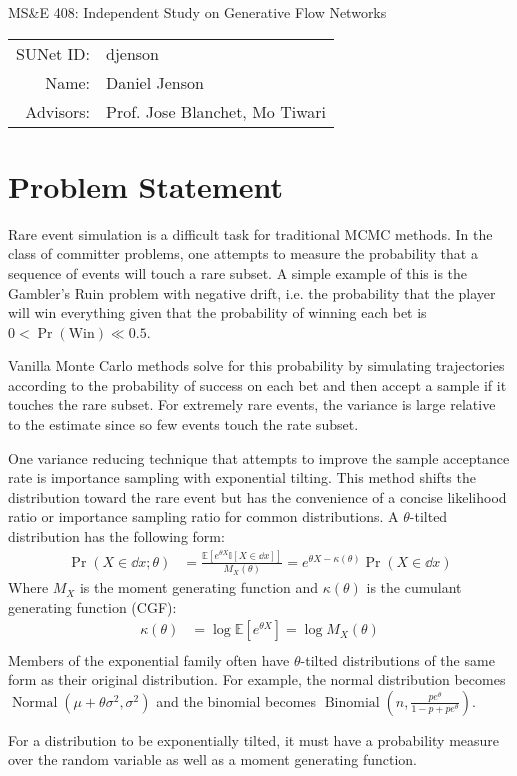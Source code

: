 \documentclass[12pt]{article}
\begin{document}
\begin{center}
  {\Large MS\&E 408: Independent Study on Generative Flow Networks}

	\begin{tabular}{rl}
		SUNet ID:      & djenson                            \\
		Name:          & Daniel Jenson                      \\
		Advisors: & Prof. Jose Blanchet, Mo Tiwari
	\end{tabular}
\end{center}

\section*{Problem Statement}
Rare event simulation is a difficult task for traditional MCMC methods. In the
class of committer problems, one attempts to measure the probability that a
sequence of events will touch a rare subset. A simple example of this is the
Gambler's Ruin problem with negative drift, i.e. the probability that the
player will win everything given that the probability of winning each bet is $0
< \Pr(\text{Win}) \ll 0.5$.
\par
Vanilla Monte Carlo methods solve for this probability by simulating
trajectories according to the probability of success on each bet and then
accept a sample if it touches the rare subset. For extremely rare events, the
variance is large relative to the estimate since so few events touch the rate
subset.
\par
One variance reducing technique that attempts to improve the sample acceptance
rate is importance sampling with exponential tilting. This method shifts the
distribution toward the rare event but has the convenience of a concise
likelihood ratio or importance sampling ratio for common distributions. A
$\theta$-tilted distribution has the following form:
\[
  \begin{aligned}
      \Pr(X\in\dd x;\theta) &= \frac{\mathbb{E}\left[e^{\theta X}\mathbb{I}[X\in\dd x]\right]}{M_X(\theta)}=e^{\theta X-\kappa(\theta)}\Pr(X\in\dd x)
  \end{aligned}
\]
Where $M_X$ is the moment generating function and $\kappa(\theta)$ is the
cumulant generating function (CGF):
\[
  \begin{aligned}
    \kappa(\theta) &= \log \mathbb{E}\left[e^{\theta X}\right]=\log M_X(\theta) \\
  \end{aligned}
\]
Members of the exponential family often have $\theta$-tilted distributions of
the same form as their original distribution. For example, the normal
distribution becomes
$\operatorname{Normal}\left(\mu+\theta\sigma^2,\sigma^2\right)$ and the binomial
becomes $\operatorname{Binomial}\left(n,\frac{pe^\theta}{1-p+pe^\theta}\right)$.
\par
For a distribution to be exponentially tilted, it must have a probability
measure over the random variable as well as a moment generating function.
\end{document}
